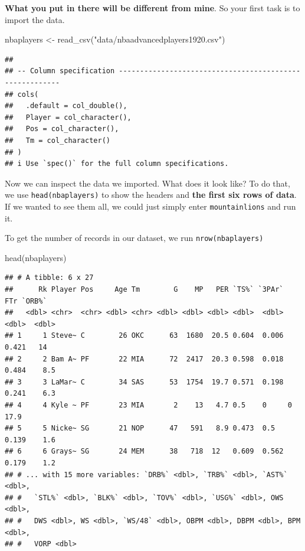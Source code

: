 \documentclass[
]{book}
\newenvironment{Shaded}{\begin{snugshade}}{\end{snugshade}}
\newcommand{\FunctionTok}[1]{\textcolor[rgb]{0.00,0.00,0.00}{#1}}
\newcommand{\NormalTok}[1]{#1}
\newcommand{\OtherTok}[1]{\textcolor[rgb]{0.56,0.35,0.01}{#1}}
\newcommand{\StringTok}[1]{\textcolor[rgb]{0.31,0.60,0.02}{#1}}
\begin{document}
\textbf{What you put in there will be different from mine}. So your first task is to import the data.

\begin{Shaded}
\begin{Highlighting}[]
\NormalTok{nbaplayers }\OtherTok{\textless{}{-}} \FunctionTok{read\_csv}\NormalTok{(}\StringTok{"data/nbaadvancedplayers1920.csv"}\NormalTok{)}
\end{Highlighting}
\end{Shaded}

\begin{verbatim}
## 
## -- Column specification --------------------------------------------------------
## cols(
##   .default = col_double(),
##   Player = col_character(),
##   Pos = col_character(),
##   Tm = col_character()
## )
## i Use `spec()` for the full column specifications.
\end{verbatim}

Now we can inspect the data we imported. What does it look like? To do that, we use \texttt{head(nbaplayers)} to show the headers and \textbf{the first six rows of data}. If we wanted to see them all, we could just simply enter \texttt{mountainlions} and run it.

To get the number of records in our dataset, we run \texttt{nrow(nbaplayers)}

\begin{Shaded}
\begin{Highlighting}[]
\FunctionTok{head}\NormalTok{(nbaplayers)}
\end{Highlighting}
\end{Shaded}

\begin{verbatim}
## # A tibble: 6 x 27
##      Rk Player Pos     Age Tm        G    MP   PER `TS%` `3PAr`   FTr `ORB%`
##   <dbl> <chr>  <chr> <dbl> <chr> <dbl> <dbl> <dbl> <dbl>  <dbl> <dbl>  <dbl>
## 1     1 Steve~ C        26 OKC      63  1680  20.5 0.604  0.006 0.421   14  
## 2     2 Bam A~ PF       22 MIA      72  2417  20.3 0.598  0.018 0.484    8.5
## 3     3 LaMar~ C        34 SAS      53  1754  19.7 0.571  0.198 0.241    6.3
## 4     4 Kyle ~ PF       23 MIA       2    13   4.7 0.5    0     0       17.9
## 5     5 Nicke~ SG       21 NOP      47   591   8.9 0.473  0.5   0.139    1.6
## 6     6 Grays~ SG       24 MEM      38   718  12   0.609  0.562 0.179    1.2
## # ... with 15 more variables: `DRB%` <dbl>, `TRB%` <dbl>, `AST%` <dbl>,
## #   `STL%` <dbl>, `BLK%` <dbl>, `TOV%` <dbl>, `USG%` <dbl>, OWS <dbl>,
## #   DWS <dbl>, WS <dbl>, `WS/48` <dbl>, OBPM <dbl>, DBPM <dbl>, BPM <dbl>,
## #   VORP <dbl>
\end{verbatim}
\end{document}
